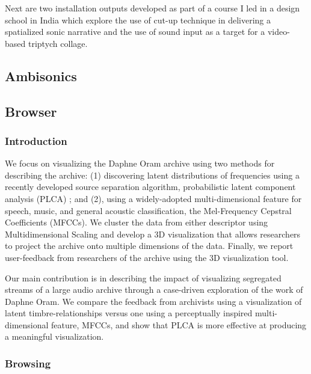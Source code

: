 \documentclass[a4paper,10pt,final]{ThesisStyle}
\begin{document}
Next are two installation outputs developed as part of a course I led in a design school in India which explore the use of cut-up technique in delivering a spatialized sonic narrative and the use of sound input as a target for a video-based triptych collage.  

\subsection{Ambisonics}




\subsection{Browser}

\subsubsection{Introduction}
We focus on visualizing the Daphne Oram archive using two methods for describing the archive: (1) discovering latent distributions of frequencies using a recently developed source separation algorithm, probabilistic latent component analysis (PLCA) \cite{SmaragdisRajShashanka}; and (2), using a widely-adopted multi-dimensional feature for speech, music, and general acoustic classification, the Mel-Frequency Cepstral Coefficients (MFCCs).  We cluster the data from either descriptor using Multidimensional Scaling and develop a 3D visualization that allows researchers to project the archive onto multiple dimensions of the data.  Finally, we report user-feedback from researchers of the archive using the 3D visualization tool.  

Our main contribution is in describing the impact of visualizing segregated streams of a large audio archive through a case-driven exploration of the work of Daphne Oram.  We compare the feedback from archivists using a visualization of latent timbre-relationships versus one using a perceptually inspired multi-dimensional feature, MFCCs, and show that PLCA is more effective at producing a meaningful visualization.  


\subsubsection{Browsing}
\end{document}
